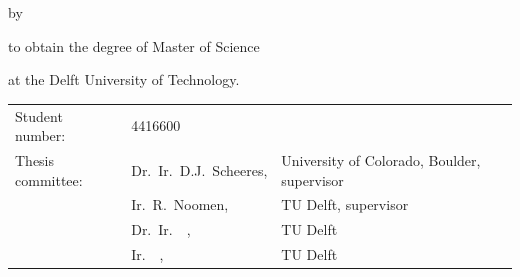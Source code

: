 \begin{titlepage}


\begin{center}


{\makeatletter
\titlestyle
\color{tudelft-cyan}
\fontsize{34}{30}
\selectfont{Perturbed orbital motion of regolith around asteroids \par}
\makeatother}

\bigskip
\bigskip
{\makeatletter
\ifx\@subtitle\undefined\else
    \bigskip
   {\tudsffamily\fontsize{16}{32}\selectfont\@subtitle}
\fi
\makeatother}

\bigskip
\bigskip

by

\bigskip
\bigskip

{\makeatletter
\titlestyle\fontsize{26}{26}\selectfont\@author
\makeatother}

\bigskip
\bigskip

to obtain the degree of Master of Science

at the Delft University of Technology.


\vfill

\begin{tabular}{lll}
    Student number: & 4416600 \\
    Thesis committee: & Dr.\ Ir.\ D.J.\ Scheeres, & University of Colorado, Boulder, supervisor \\
        & Ir.\ R.\ Noomen, & TU Delft, supervisor \\
        & Dr.\ Ir.\ \ , & TU Delft \\
        & Ir.\ \ , & TU Delft
\end{tabular}


\end{center}
\end{titlepage}
